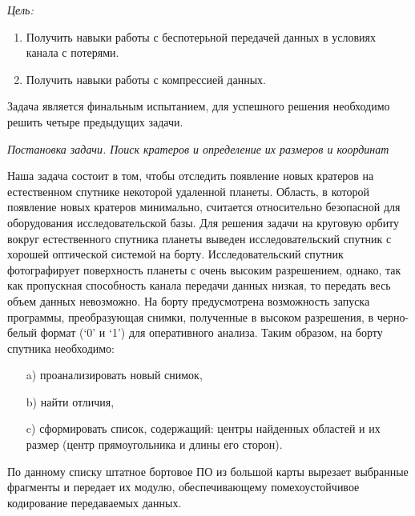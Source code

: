 
\textit{Цель:}
\begin{enumerate}
    \item Получить навыки работы с беспотерьной передачей данных в условиях канала с потерями.
    \item Получить навыки работы с компрессией данных.
\end{enumerate}

Задача является финальным испытанием, для успешного решения необходимо решить четыре предыдущих задачи.

\textit{Постановка задачи. Поиск кратеров и определение их размеров и координат}

Наша задача состоит в том, чтобы отследить появление новых кратеров на естественном спутнике некоторой удаленной планеты. Область, в которой появление новых кратеров минимально, считается относительно безопасной для оборудования исследовательской базы. Для решения задачи на круговую орбиту вокруг естественного спутника планеты выведен исследовательский спутник с хорошей оптической системой на борту. Исследовательский спутник фотографирует поверхность планеты с очень высоким разрешением, однако, так как пропускная способность канала передачи данных низкая, то передать весь объем данных невозможно. На борту предусмотрена возможность запуска программы, преобразующая снимки, полученные в высоком разрешения, в черно-белый формат (‘0’ и ‘1’) для оперативного анализа. Таким образом, на борту спутника необходимо: 
\begin{enumerate}
    \item[a)] проанализировать новый снимок, 
    \item[b)] найти отличия, 
    \item[c)] сформировать список, содержащий: центры найденных областей и их размер (центр прямоугольника и длины его сторон). 
\end{enumerate}
По данному списку штатное бортовое ПО из большой карты вырезает выбранные фрагменты и передает их модулю, обеспечивающему помехоустойчивое кодирование передаваемых данных.

